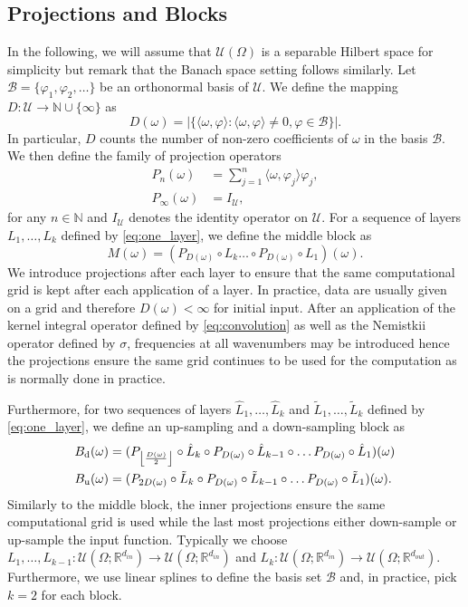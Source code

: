 \documentclass[preprint,11pt]{elsarticle}
\theoremstyle{plain}
\newcommand{\R}{\mathbb{R}}
\newcommand{\N}{\mathbb{N}}
\newcommand{\U}{\mathcal{U}}
\DeclarePairedDelimiter\floor{\lfloor}{\rfloor}
\begin{document}
\subsection{Projections and Blocks}

In the following, we will assume that $\U(\Omega)$ is a separable Hilbert space for simplicity but remark that the Banach space setting follows similarly. Let $\mathcal{B} = \{\varphi_1,\varphi_2,\dots\}$ be an orthonormal basis of $\U$. We define the mapping $D : \U \to \mathbb{N} \cup \{\infty\}$ as 
\begin{equation}
    D(\omega) = | \{\langle \omega, \varphi \rangle : \langle \omega, \varphi \rangle \neq 0, \varphi \in \mathcal{B}\} |.
\end{equation}
In particular, $D$ counts the number of non-zero coefficients of $\omega$ in the basis $\mathcal{B}$. We then define the family of projection operators
\begin{align}
    P_n (\omega) &= \sum_{j=1}^n \langle \omega, \varphi_j \rangle \varphi_j, \\
    P_\infty(\omega) &= I_{\mathcal{U}},
\end{align}
for any $n \in \N$ and $I_\mathcal{U}$ denotes the identity operator on $\mathcal{U}$. For a sequence of layers $L_1,\dots,L_k$ defined by \eqref{eq:one_layer}, we define the middle block as
\begin{equation}
    M(\omega) = (P_{D(\omega)} \circ L_k \dots \circ P_{D(\omega)} \circ L_1)(\omega).
\end{equation}
We introduce projections after each layer to ensure that the same computational grid is kept after each application of a layer. In practice, data are usually given on a grid and therefore $D(\omega) < \infty$ for initial input. After an application of the kernel integral operator defined by \eqref{eq:convolution} as well as the Nemistkii operator defined by $\sigma$, frequencies at all wavenumbers may be introduced hence the projections ensure the same grid continues to be used for the computation as is normally done in practice.

Furthermore, for two sequences of layers $\hat{L}_1,\dots,\hat{L}_k$ and $\tilde{L}_1,\dots,\tilde{L}_k$ defined by \eqref{eq:one_layer}, we define an up-sampling and a down-sampling block as
\begin{align}
    B_{\text{d}} (\omega) &= (P_{\floor*{\frac{D(\omega)}{2}}} \circ \hat{L}_k \circ P_{D(\omega)} \circ \hat{L}_{k-1} \circ \dots P_{D(\omega)} \circ \hat{L}_1) (\omega) \\
    B_{\text{u}} (\omega) &= (P_{2 D(\omega)} \circ \tilde{L}_k \circ P_{D(\omega)} \circ \tilde{L}_{k-1} \circ \dots P_{D(\omega)} \circ \tilde{L}_1) (\omega).
\end{align}
Similarly to the middle block, the inner projections ensure the same computational grid is used while the last most projections either down-sample or up-sample the input function. Typically we choose $L_1,\dots,L_{k-1} : \mathcal{U}(\Omega;\R^{d_{in}}) \to \mathcal{U}(\Omega;\R^{d_{in}})$ and $L_k : \mathcal{U}(\Omega;\R^{d_{in}}) \to \mathcal{U}(\Omega;\R^{d_{out}})$. Furthermore, we use linear splines to define the basis set $\mathcal{B}$ \cite{devore1993constructive} and, in practice, pick $k=2$ for each block.
\end{document}
